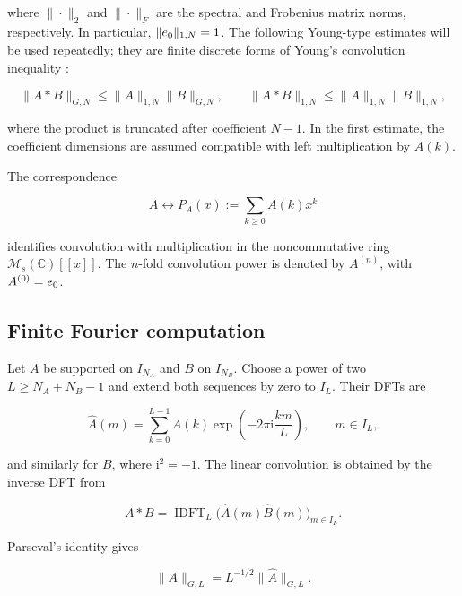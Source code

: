 \documentclass[3p,12pt,authoryear]{elsarticle}
\theoremstyle{definition}
\theoremstyle{remark}
\newcommand{\C}{\mathbb C}
\newcommand{\ez}{e_{\mathstrut 0}}
\begin{document}
where $\|\cdot\|_2$ and $\|\cdot\|_F$ are the spectral and Frobenius matrix norms, respectively. In particular, $\|\ez\|_{1,N}=1$. The following Young-type estimates will be used repeatedly; they are finite discrete forms of Young's convolution inequality \citep{Folland1999}:

\begin{equation}\label{eq:young}
\|A*B\|_{G,N}\leq\|A\|_{1,N}\|B\|_{G,N},
\qquad
\|A*B\|_{1,N}\leq\|A\|_{1,N}\|B\|_{1,N},
\end{equation}

where the product is truncated after coefficient $N-1$. In the first estimate, the coefficient dimensions are assumed compatible with left multiplication by $A(k)$.

The correspondence

\begin{equation*}
A\longleftrightarrow P_A(x):=\sum_{k\geq0}A(k)x^k
\end{equation*}

identifies convolution with multiplication in the noncommutative ring $\mathcal M_s(\C)[[x]]$. The $n$-fold convolution power is denoted by $A^{(n)}$, with $A^{(0)}=\ez$.

\subsection{Finite Fourier computation}

Let $A$ be supported on $I_{N_A}$ and $B$ on $I_{N_B}$. Choose a power of two $L\geq N_A+N_B-1$ and extend both sequences by zero to $I_L$. Their DFTs are

\begin{equation*}
\widehat A(m)=\sum_{k=0}^{L-1}A(k)\exp\left(-2\pi\mathrm i\frac{km}{L}\right),
\qquad m\in I_L,
\end{equation*}

and similarly for $B$, where $\mathrm i^2=-1$. The linear convolution is obtained by the inverse DFT from

\begin{equation}\label{eq:fft-convolution}
A*B=\operatorname{IDFT}_L\bigl(\widehat A(m)\widehat B(m)\bigr)_{m\in I_L}.
\end{equation}

Parseval's identity gives

\begin{equation}\label{eq:parseval}
\|A\|_{G,L}=L^{-1/2}\|\widehat A\|_{G,L}.
\end{equation}
\end{document}
